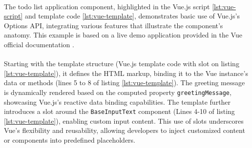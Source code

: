 
\paragraph{}The todo list application component, highlighted in the Vue.js script \ref{lst:vue-script} and template code \ref{lst:vue-template}, demonstrates basic use of Vue.js's Options API, integrating various features that illustrate the component's anatomy. This example is based on a live demo application provided in the Vue official documentation \cite{vuejs2023sfc}.

\paragraph{} Starting with the template structure (Vue.js template code with slot on listing \ref{lst:vue-template}), it defines the HTML markup, binding it to the Vue instance's data or methods (lines 5 to 8 of listing \ref{lst:vue-template}). The greeting message is dynamically rendered based on the computed property \verb|greetingMessage|, showcasing Vue.js's reactive data binding capabilities. The template further introduces a slot around the \verb|BaseInputText| component (Lines 4-10 of listing \ref{lst:vue-template}), enabling custom input content. This use of slots underscores Vue's flexibility and reusability, allowing developers to inject customized content or components into predefined placeholders.

